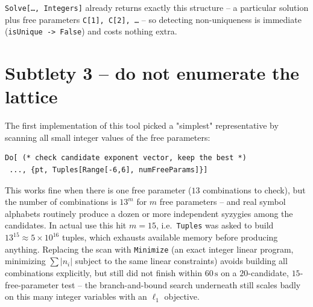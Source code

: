 \documentclass[11pt]{article}
\newcommand{\code}[1]{\texttt{#1}}
\begin{document}
\code{Solve[\ldots, Integers]} already returns exactly this structure -- a particular solution plus free parameters \code{C[1], C[2], \ldots} -- so detecting non-uniqueness is immediate (\code{isUnique -> False}) and costs nothing extra.

\section{Subtlety 3 -- do not enumerate the lattice}

The first implementation of this tool picked a "simplest" representative by scanning all small integer values of the free parameters:
\begin{lstlisting}
Do[ (* check candidate exponent vector, keep the best *)
 ..., {pt, Tuples[Range[-6,6], numFreeParams]}]
\end{lstlisting}
This works fine when there is one free parameter ($13$ combinations to check), but the number of combinations is $13^{m}$ for $m$ free parameters -- and real symbol alphabets routinely produce a dozen or more independent syzygies among the candidates. In actual use this hit $m=15$, i.e.\ \code{Tuples} was asked to build $13^{15}\approx 5\times10^{16}$ tuples, which exhausts available memory before producing anything. Replacing the scan with \code{Minimize} (an exact integer linear program, minimizing $\sum|n_i|$ subject to the same linear constraints) avoids building all combinations explicitly, but still did not finish within $60\,\mathrm{s}$ on a $20$-candidate, $15$-free-parameter test -- the branch-and-bound search underneath still scales badly on this many integer variables with an $\ell_1$ objective.
\end{document}
